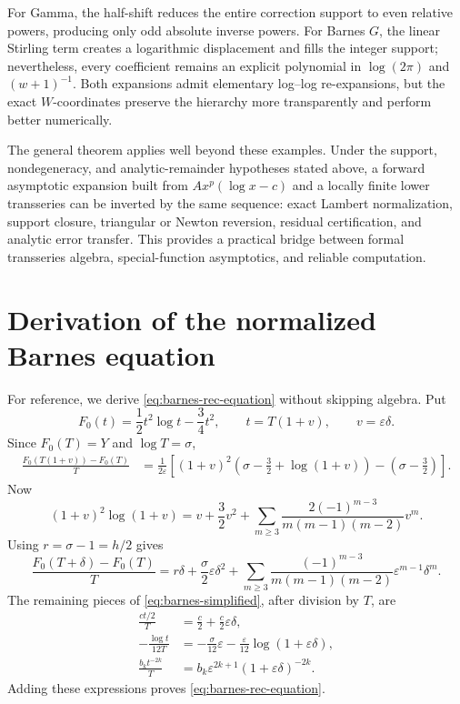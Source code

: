 \documentclass[11pt]{article}
\theoremstyle{definition}
\theoremstyle{remark}
\begin{document}
For Gamma, the half-shift reduces the entire correction support to even relative powers, producing only odd absolute inverse powers.  For Barnes \(G\), the linear Stirling term creates a logarithmic displacement and fills the integer support; nevertheless, every coefficient remains an explicit polynomial in \(\log(2\pi)\) and \((w+1)^{-1}\).  Both expansions admit elementary log--log re-expansions, but the exact \(W\)-coordinates preserve the hierarchy more transparently and perform better numerically.

The general theorem applies well beyond these examples.  Under the support, nondegeneracy, and analytic-remainder hypotheses stated above, a forward asymptotic expansion built from
\(A x^p(\log x-c)\) and a locally finite lower transseries can be inverted by the same sequence: exact Lambert normalization, support closure, triangular or Newton reversion, residual certification, and analytic error transfer.  This provides a practical bridge between formal transseries algebra, special-function asymptotics, and reliable computation.

\appendix

\section{Derivation of the normalized Barnes equation}\label{app:barnes-derivation}

For reference, we derive \cref{eq:barnes-rec-equation} without skipping algebra.  Put
\[
 F_0(t)=\frac12t^2\log t-\frac34t^2,
 \qquad t=T(1+v),\qquad v=\varepsilon\delta.
\]
Since \(F_0(T)=Y\) and \(\log T=\sigma\),
\begin{align*}
 \frac{F_0(T(1+v))-F_0(T)}{T}
 &=\frac1{2\varepsilon}
 \left[(1+v)^2\left(\sigma-\frac32+\log(1+v)\right)
 -\left(\sigma-\frac32\right)\right].
\end{align*}
Now
\begin{equation}\label{eq:oneplus-square-log}
 (1+v)^2\log(1+v)
 =v+\frac32v^2+
 \sum_{m\ge3}\frac{2(-1)^{m-3}}{m(m-1)(m-2)}v^m.
\end{equation}
Using \(r=\sigma-1=h/2\) gives
\begin{equation}\label{eq:F0-barnes-diff}
 \frac{F_0(T+\delta)-F_0(T)}{T}
 =r\delta+\frac{\sigma}{2}\varepsilon\delta^2
 +\sum_{m\ge3}\frac{(-1)^{m-3}}{m(m-1)(m-2)}
 \varepsilon^{m-1}\delta^m.
\end{equation}
The remaining pieces of \cref{eq:barnes-simplified}, after division by \(T\), are
\begin{align*}
 \frac{ct/2}{T}&=\frac c2+\frac c2\varepsilon\delta,\\
 -\frac{\log t}{12T}
 &=-\frac{\sigma}{12}\varepsilon
 -\frac{\varepsilon}{12}\log(1+\varepsilon\delta),\\
 \frac{b_k t^{-2k}}{T}
 &=b_k\varepsilon^{2k+1}(1+\varepsilon\delta)^{-2k}.
\end{align*}
Adding these expressions proves \cref{eq:barnes-rec-equation}.
\end{document}
